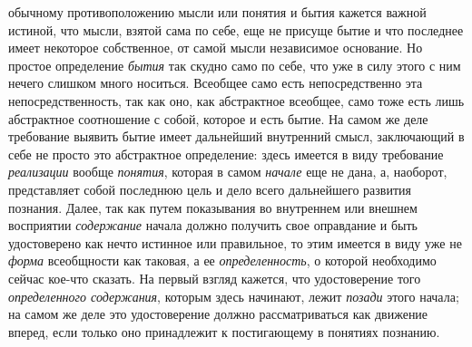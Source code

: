 {{обычному противоположению мысли или понятия и бытия кажется важной истиной,
что мысли, взятой сама по себе, еще не присуще бытие и что последнее имеет
некоторое собственное, от самой мысли независимое основание. Но простое
определение {\em бытия}
так скудно само по себе, что уже в силу этого с ним нечего
слишком много носиться. Всеобщее само есть непосредственно эта
непосредственность, так как оно, как абстрактное всеобщее, само тоже есть
лишь абстрактное соотношение с собой, которое и есть бытие. На самом же
деле требование выявить бытие имеет дальнейший внутренний
смысл, заключающий в себе не просто это абстрактное определение: здесь
имеется в виду требование {\em реализации} вообще
{\em понятия}, которая в самом {\em начале} еще не
дана, а, наоборот, представляет собой последнюю цель и дело всего
дальнейшего развития познания. Далее, так как путем показывания во
внутреннем или внешнем восприятии {\em содержание} начала
должно получить свое оправдание и быть удостоверено как нечто истинное или
правильное, то этим имеется в виду уже не
{\em форма} всеобщности
как таковая, а ее {\em определенность},
о которой необходимо сейчас кое-что сказать. На первый взгляд
кажется, что удостоверение того {\em определенного содержания},
которым здесь начинают, лежит {\em позади} этого начала;
на самом же деле это удостоверение должно рассматриваться как движение
вперед, если только оно принадлежит к постигающему в понятиях познанию.

}}
